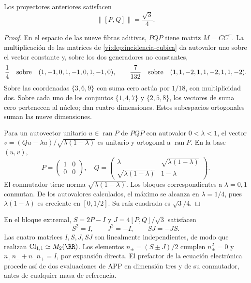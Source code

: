 \begin{proposition}
\label{vi:dep:norma-PQ}
Los proyectores anteriores satisfacen
\begin{equation}
 \|[P,Q]\|=\frac{\sqrt3}{4}.
 \label{vi:dep:prefactor-valor}
\end{equation}
\end{proposition}
\begin{proof}
En el espacio de las nueve fibras aditivas, \(PQP\) tiene matriz
\(M=CC^{\mathsf T}\). La multiplicación de las matrices de
\eqref{vi:dep:incidencia-cubica} da autovalor uno sobre el vector
constante y, sobre los dos generadores no constantes,
\[
 \frac14\quad\hbox{sobre}\quad(1,-1,0,1,-1,0,1,-1,0),
 \qquad
 \frac7{132}\quad\hbox{sobre}\quad(1,1,-2,1,1,-2,1,1,-2).
\]
Sobre las coordenadas \(\{3,6,9\}\) con suma cero actúa por
\(1/18\), con multiplicidad dos. Sobre cada uno de los conjuntos
\(\{1,4,7\}\) y \(\{2,5,8\}\), los vectores de suma cero
pertenecen al núcleo; dan cuatro dimensiones. Estos subespacios
ortogonales suman las nueve dimensiones.

Para un autovector unitario \(u\in\operatorname{ran}P\) de
\(PQP\) con autovalor \(0<\lambda<1\), el vector
\(v=(Qu-\lambda u)/\sqrt{\lambda(1-\lambda)}\) es unitario y
ortogonal a \(\operatorname{ran}P\). En la base \((u,v)\),
\[
 P=\begin{pmatrix}1&0\\0&0\end{pmatrix},\quad
 Q=\begin{pmatrix}\lambda&\sqrt{\lambda(1-\lambda)}\\
 \sqrt{\lambda(1-\lambda)}&1-\lambda\end{pmatrix}.
\]
El conmutador tiene norma \(\sqrt{\lambda(1-\lambda)}\).
Los bloques correspondientes a \(\lambda=0,1\) conmutan. De los
autovalores calculados, el máximo se alcanza en \(\lambda=1/4\),
pues \(\lambda(1-\lambda)\) es creciente en \([0,1/2]\).
Su raíz cuadrada es \(\sqrt3/4\).
\end{proof}

En el bloque extremal, \(S=2P-I\) y
\(J=4[P,Q]/\sqrt3\) satisfacen
\[
 S^2=I,\qquad J^2=-I,\qquad SJ=-JS.
\]
Las cuatro matrices \(I,S,J,SJ\) son linealmente independientes,
de modo que realizan \(\mathrm{Cl}_{1,1}\simeq M_2(\RR)\).
Los elementos \(n_\pm=(S\pm J)/2\) cumplen
\(n_\pm^2=0\) y \(n_+n_-+n_-n_+=I\), por expansión directa.
El prefactor de la ecuación electrónica procede así de dos evaluaciones
de APP en dimensión tres y de su conmutador, antes de cualquier masa
de referencia.

